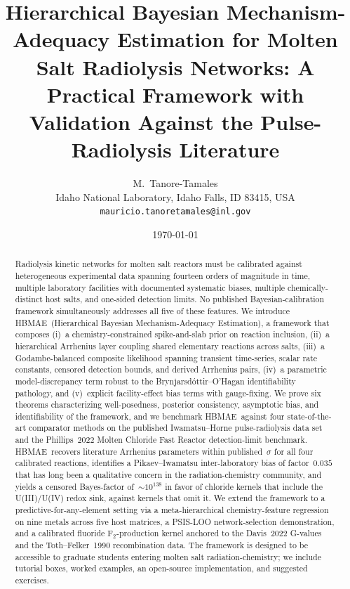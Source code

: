 \documentclass[12pt]{article}
\title{\bfseries Hierarchical Bayesian Mechanism-Adequacy Estimation for Molten Salt
       Radiolysis Networks: A Practical Framework with Validation Against the
       Pulse-Radiolysis Literature}
\author{M.\ Tanore-Tamales \\
        \small Idaho National Laboratory, Idaho Falls, ID 83415, USA \\
        \small \texttt{mauricio.tanoretamales@inl.gov}}
\date{\today}
\theoremstyle{plain}
\theoremstyle{definition}
\theoremstyle{remark}
\newcommand{\HBMAE}{HBMAE\xspace}
\begin{document}
\maketitle

\begin{abstract}
\noindent
Radiolysis kinetic networks for molten salt reactors must be calibrated against
heterogeneous experimental data spanning fourteen orders of magnitude in time,
multiple laboratory facilities with documented systematic biases, multiple
chemically-distinct host salts, and one-sided detection limits.  No published
Bayesian-calibration framework simultaneously addresses all five of these features.
We introduce \HBMAE\ (Hierarchical Bayesian Mechanism-Adequacy Estimation), a
framework that composes (i)~a chemistry-constrained spike-and-slab prior on
reaction inclusion, (ii)~a hierarchical Arrhenius layer coupling shared
elementary reactions across salts, (iii)~a Godambe-balanced composite likelihood
spanning transient time-series, scalar rate constants, censored detection
bounds, and derived Arrhenius pairs, (iv)~a parametric model-discrepancy term
robust to the Brynjarsd\'ottir--O'Hagan identifiability pathology, and
(v)~explicit facility-effect bias terms with gauge-fixing.  We prove six
theorems characterizing well-posedness, posterior consistency, asymptotic bias,
and identifiability of the framework, and we benchmark \HBMAE\ against four
state-of-the-art comparator methods on the published Iwamatsu--Horne
pulse-radiolysis data set and the Phillips~2022 Molten Chloride Fast Reactor
detection-limit benchmark.  \HBMAE\ recovers literature Arrhenius parameters
within published~$\sigma$ for all four calibrated reactions, identifies a
Pikaev--Iwamatsu inter-laboratory bias of factor~$0.035$ that has long been a
qualitative concern in the radiation-chemistry community, and yields a censored
Bayes-factor of~$\sim 10^{138}$ in favor of chloride kernels that include the
\mbox{U(III)/U(IV)} redox sink, against kernels that omit it.  We extend the
framework to a predictive-for-any-element setting via a meta-hierarchical
chemistry-feature regression on nine metals across five host matrices, a
PSIS-LOO network-selection demonstration, and a calibrated fluoride
F$_2$-production kernel anchored to the Davis~2022 G-values and the
Toth--Felker~1990 recombination data.  The framework is designed to be
accessible to graduate students entering molten salt
radiation-chemistry; we include tutorial boxes, worked examples, an open-source
implementation, and suggested exercises.
\end{abstract}
\end{document}
